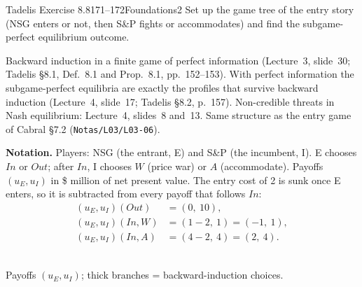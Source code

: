 \begin{exsol}{Tadelis Exercise 8.8}{171--172}{Foundations}{2}
\asked Set up the game tree of the entry story (NSG enters or not, then S\&P fights or
accommodates) and find the subgame-perfect equilibrium outcome.

\method Backward induction in a finite game of perfect information (Lecture~3, slide~30; Tadelis
\S8.1, Def.~8.1 and Prop.~8.1, pp.~152--153). With perfect information the subgame-perfect
equilibria are exactly the profiles that survive backward induction (Lecture~4, slide~17; Tadelis
\S8.2, p.~157). Non-credible threats in Nash equilibrium: Lecture~4, slides~8 and~13. Same structure
as the entry game of Cabral \S7.2 (\texttt{Notas/L03/L03-06}).

\solution
\textbf{Notation.} Players: NSG (the entrant, E) and S\&P (the incumbent, I). E chooses
$\mathit{In}$ or $\mathit{Out}$; after $\mathit{In}$, I chooses $W$ (price war) or $A$
(accommodate). Payoffs $(u_E, u_I)$ in \$ million of net present value. The entry cost of 2 is
sunk once E enters, so it is subtracted from every payoff that follows $\mathit{In}$:
\begin{align*}
  (u_E,u_I)(\mathit{Out}) &= (0,\ 10),\\
  (u_E,u_I)(\mathit{In},W) &= (1-2,\ 1) = (-1,\ 1),\\
  (u_E,u_I)(\mathit{In},A) &= (4-2,\ 4) = (2,\ 4).
\end{align*}
\begin{center}
\\[2pt]
{\footnotesize Payoffs $(u_E, u_I)$; thick branches = backward-induction choices.}
\end{center}


\end{exsol}
